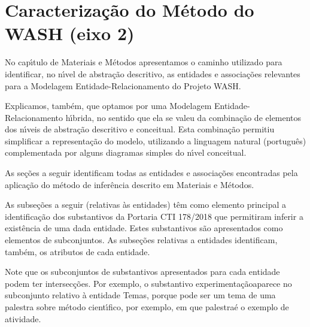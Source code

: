 \documentclass[
12pt,		%
openright,	%
twoside,  %
a4paper,			%
chapter=TITLE,		%
english,			%
french,				%
spanish,			%
brazil				%
]{USPSC-classe/USPSC}
\begin{document}
\section[Caracteriza\c{c}\~ao do M\'etodo do WASH (eixo 2)]{Caracteriza\c{c}\~ao do M\'etodo do WASH (eixo 2)}\label{Caracteriza\c{c}\~ao do M\'etodo do WASH (eixo 2)}
No cap\'{\i}tulo de Materiais e M\'etodos apresentamos o caminho utilizado para identificar, no n\'{\i}vel de abstra\c{c}\~ao descritivo, as entidades e associa\c{c}\~oes relevantes para a Modelagem Entidade-Relacionamento do Projeto WASH.










Explicamos, tamb\'em, que optamos por uma Modelagem Entidade-Relacionamento h\'{\i}brida, no sentido que ela se valeu da combina\c{c}\~ao de elementos dos n\'{\i}veis de abstra\c{c}\~ao descritivo e conceitual. Esta combina\c{c}\~ao permitiu simplificar a representa\c{c}\~ao do modelo, utilizando a linguagem natural (portugu\^es) complementada por alguns diagramas simples do n\'{\i}vel conceitual.










As se\c{c}\~oes a seguir identificam todas as entidades e associa\c{c}\~oes encontradas pela aplica\c{c}\~ao do m\'etodo de infer\^encia descrito em Materiais e M\'etodos.










As subse\c{c}\~oes a seguir (relativas \`as entidades) t\^em como elemento principal a identifica\c{c}\~ao dos substantivos da Portaria CTI 178/2018 que permitiram inferir a exist\^encia de uma dada entidade. Estes substantivos s\~ao apresentados como elementos de subconjuntos. As subse\c{c}\~oes relativas a entidades identificam, tamb\'em, os atributos de cada entidade.










Note que os subconjuntos de substantivos apresentados para cada entidade podem ter intersec\c{c}\~oes. Por exemplo, o substantivo \textquotedbl experimenta\c{c}\~ao\textquotedbl  aparece no subconjunto relativo \`a entidade \textquotedbl Temas\textquotedbl , porque pode ser um tema de uma palestra sobre m\'etodo cient\'{\i}fico, por exemplo, em que \textquotedbl palestra\textquotedbl  \'e o exemplo de atividade.
\end{document}
